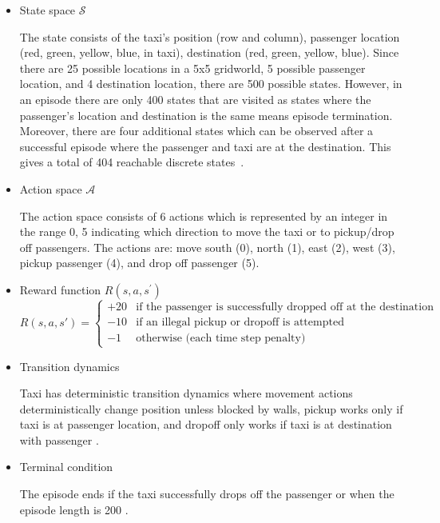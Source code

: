 \documentclass[11pt]{article}
\begin{document}
\begin{itemize}
    \item State space $\mathcal{S}$
    
    The state consists of the taxi’s position (row and column), passenger location (red, green, yellow, blue, in taxi), destination (red, green, yellow, blue). Since there are 25 possible locations in a 5x5 gridworld, 5 possible passenger location, and 4 destination location, there are 500 possible states. However, in an episode there are only 400 states that are visited as states where the passenger's location and destination is the same means episode termination. Moreover, there are four additional states which can be observed after a successful episode where the passenger and taxi are at the destination. This gives a total of 404 reachable discrete states~\cite{towers2024gymnasium}.

    \item Action space $\mathcal{A}$
    
    The action space consists of 6 actions which is represented by an integer in the range {0, 5} indicating which direction to move the taxi or to pickup/drop off passengers. The actions are: move south (0), north (1), east (2), west (3), pickup passenger (4), and drop off passenger (5).~\cite{towers2024gymnasium}

    \item Reward function $R(s, a, s^\prime)$
    \[
    R(s,a,s') =
    \begin{cases}
    +20 & \text{if the passenger is successfully dropped off at the destination} \\
    -10 & \text{if an illegal pickup or dropoff is attempted} \\
    -1  & \text{otherwise (each time step penalty)}
    \end{cases}
    \]

    \item Transition dynamics
    
    Taxi has deterministic transition dynamics where movement actions deterministically change position unless blocked by walls, pickup works only if taxi is at passenger location, and dropoff only works if taxi is at destination with passenger \cite{towers2024gymnasium}.

    \item Terminal condition
    
    The episode ends if the taxi successfully drops off the passenger or when the episode length is 200 \cite{towers2024gymnasium}.

\end{itemize}
\end{document}

